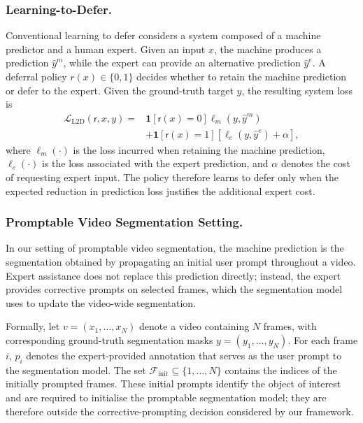 \subsubsection{Learning-to-Defer.}

Conventional learning to defer considers a system composed of a machine
predictor and a human expert. Given an input \(x\), the machine produces a
prediction \(\widehat{y}^{m}\), while the expert can provide an alternative
prediction \(\widehat{y}^{e}\). A deferral policy
\(r(x)\in\{0,1\}\) decides whether to retain the machine prediction or
defer to the expert. Given the ground-truth target \(y\), the resulting
system loss is
\begin{equation}
\begin{aligned}
\mathcal{L}_{\mathrm{L2D}}(\mathsf{r},x,y)
={}&
\mathbf{1}\!\left[\mathsf{r}(x)=0\right]
\ell_m\!\left(y,\widehat{y}^{m}\right)
\\
&+
\mathbf{1}\!\left[\mathsf{r}(x)=1\right]
\left[
\ell_e\!\left(y,\widehat{y}^{e}\right)+\alpha
\right],
\end{aligned}
\label{eq:conventional_l2d}
\end{equation}
where \(\ell_m(\cdot)\) is the loss incurred when retaining the machine
prediction, \(\ell_e(\cdot)\) is the loss associated with the expert
prediction, and \(\alpha\) denotes the cost of requesting expert input.
The policy therefore learns to defer only when the expected reduction in
prediction loss justifies the additional expert cost.

\subsubsection{Promptable Video Segmentation Setting.}
\label{sec:expert_deferral_pvs}

In our setting of promptable video segmentation, the machine prediction is the segmentation
obtained by propagating an initial user prompt throughout a video. Expert
assistance does not replace this prediction directly; instead, the expert
provides corrective prompts on selected frames, which the segmentation model
uses to update the video-wide segmentation.

Formally, let \(v=(x_1,\ldots,x_N)\) denote a video containing \(N\)
frames, with corresponding ground-truth segmentation masks
\(y=(y_1,\ldots,y_N)\). For each frame \(i\), \(p_i\) denotes the
expert-provided annotation that serves as the user prompt to the segmentation
model. The set
\(\mathcal{F}_{\mathrm{init}}\subseteq\{1,\ldots,N\}\) contains the
indices of the initially prompted frames. These initial prompts identify the
object of interest and are required to initialise the promptable segmentation
model; they are therefore outside the corrective-prompting decision considered
by our framework.

